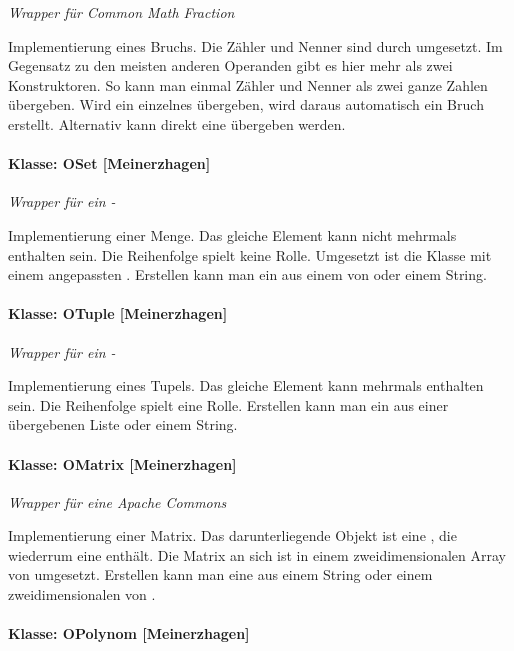 \textit{Wrapper für Common Math Fraction}

Implementierung eines Bruchs. Die Zähler und Nenner sind durch  umgesetzt. Im Gegensatz zu den meisten anderen Operanden gibt es hier mehr als zwei Konstruktoren. So kann man einmal Zähler und Nenner als zwei ganze Zahlen übergeben. Wird ein einzelnes  übergeben, wird daraus automatisch ein Bruch erstellt. Alternativ kann direkt eine  übergeben werden.

\paragraph{Klasse: OSet [Meinerzhagen]}

\textit{Wrapper für ein -}

Implementierung einer Menge. Das gleiche Element kann nicht mehrmals enthalten sein. Die Reihenfolge spielt keine Rolle. Umgesetzt ist die Klasse mit einem angepassten . Erstellen kann man ein  aus einem  von  oder einem String.

\paragraph{Klasse: OTuple [Meinerzhagen]}

\textit{Wrapper für ein -}

Implementierung eines Tupels. Das gleiche Element kann mehrmals enthalten sein. Die Reihenfolge spielt eine Rolle. Erstellen kann man ein  aus einer übergebenen Liste oder einem String.

\paragraph{Klasse: OMatrix [Meinerzhagen]}

\textit{Wrapper für eine Apache Commons }

Implementierung einer Matrix. Das darunterliegende Objekt ist eine , die wiederrum eine  enthält. Die Matrix an sich ist in einem zweidimensionalen Array von  umgesetzt. Erstellen kann man eine  aus einem String oder einem zweidimensionalen  von .


\paragraph{Klasse: OPolynom [Meinerzhagen]}

